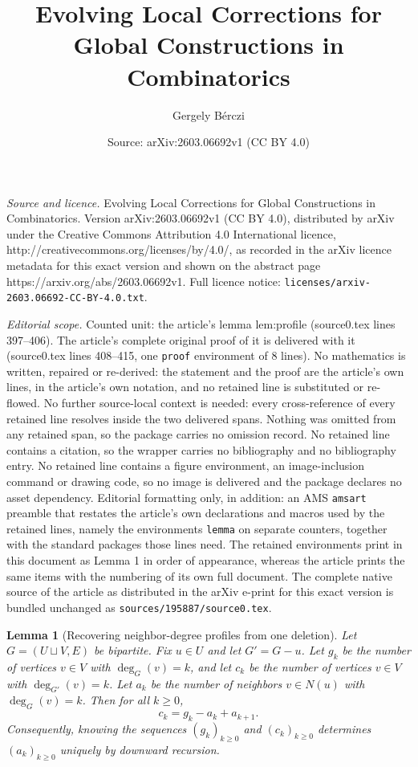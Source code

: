 \documentclass[10pt,a4paper]{amsart}
\title{Evolving Local Corrections for Global Constructions in Combinatorics}
\author{Gergely B\'erczi}
\date{Source: arXiv:2603.06692v1 (CC BY 4.0)}
\newtheorem{lemma}{Lemma}
\begin{document}
\maketitle

\noindent\emph{Source and licence.} Evolving Local Corrections for Global Constructions in Combinatorics. Version arXiv:2603.06692v1 (CC BY 4.0), distributed by arXiv under the Creative Commons Attribution 4.0 International licence, http://creativecommons.org/licenses/by/4.0/, as recorded in the arXiv licence metadata for this exact version and shown on the abstract page https://arxiv.org/abs/2603.06692v1. Full licence notice: \texttt{licenses/arxiv-2603.06692-CC-BY-4.0.txt}.\par\smallskip

\noindent\textit{Editorial scope.} Counted unit: the article's lemma lem:profile (source0.tex lines 397--406). The article's complete original proof of it is delivered with it (source0.tex lines 408--415, one \texttt{proof} environment of 8 lines). No mathematics is written, repaired or re-derived: the statement and the proof are the article's own lines, in the article's own notation, and no retained line is substituted or re-flowed.  No further source-local context is needed: every cross-reference of every retained line resolves inside the two delivered spans.  Nothing was omitted from any retained span, so the package carries no omission record.  No retained line contains a citation, so the wrapper carries no bibliography and no bibliography entry.  No retained line contains a figure environment, an image-inclusion command or drawing code, so no image is delivered and the package declares no asset dependency.  Editorial formatting only, in addition: an AMS \texttt{amsart} preamble that restates the article's own declarations and macros used by the retained lines, namely the environments \texttt{lemma} on separate counters, together with the standard packages those lines need.  The retained environments print in this document as Lemma 1 in order of appearance, whereas the article prints the same items with the numbering of its own full document.  The complete native source of the article as distributed in the arXiv e-print for this exact version is bundled unchanged as \texttt{sources/195887/source0.tex}.
\begin{lemma}[Recovering neighbor-degree profiles from one deletion]\label{lem:profile}
Let $G=(U\sqcup V,E)$ be bipartite. Fix $u\in U$ and let $G' = G-u$.
Let $g_k$ be the number of vertices $v\in V$ with $\deg_G(v)=k$, and let $c_k$ be the number of vertices $v\in V$ with $\deg_{G'}(v)=k$.
Let $a_k$ be the number of neighbors $v\in N(u)$ with $\deg_G(v)=k$.
Then for all $k\ge 0$,
\[
c_k = g_k - a_k + a_{k+1}.
\]
Consequently, knowing the sequences $(g_k)_{k\ge 0}$ and $(c_k)_{k\ge 0}$ determines $(a_k)_{k\ge 0}$ uniquely by downward recursion.
\end{lemma}
\end{document}
